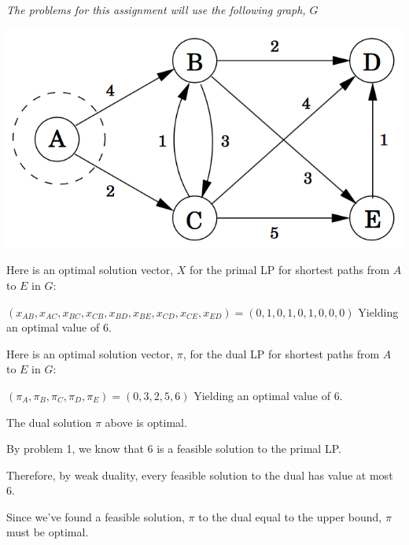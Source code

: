 \documentclass[10pt]{article}
\begin{document}
\emph{The problems for this assignment will use the following graph, $G$}

\includegraphics[scale=0.5]{graph}

\begin{problems}

  \problem

  Here is an optimal solution vector, $X$ for the primal LP for shortest paths from $A$ to $E$ in $G$:

  $(x_{AB}, x_{AC}, x_{BC}, x_{CB}, x_{BD}, x_{BE}, x_{CD}, x_{CE}, x_{ED}) = (0,1,0,1,0,1,0,0,0)$ Yielding an optimal value of 6.

  \medskip 
  \problem
  Here is an optimal solution vector, $\pi$, for the dual LP for shortest paths from $A$ to $E$ in $G$:

  $(\pi_A, \pi_B, \pi_C, \pi_D, \pi_E) = (0, 3, 2, 5, 6)$ Yielding an optimal value of 6.
  
  \medskip 
  \problem

\begin{lemma}
  The dual solution $\pi$ above is optimal.
\end{lemma}

\begin{longFormProof}

    \step By problem 1, we know that 6 is a feasible solution to the primal LP.

    \step Therefore, by weak duality, every feasible solution to the dual has value at most 6.

    \step Since we've found a feasible solution, $\pi$ to the dual equal to the upper bound, $\pi$ must be optimal.
\end{longFormProof}

\end{problems}
\end{document}
